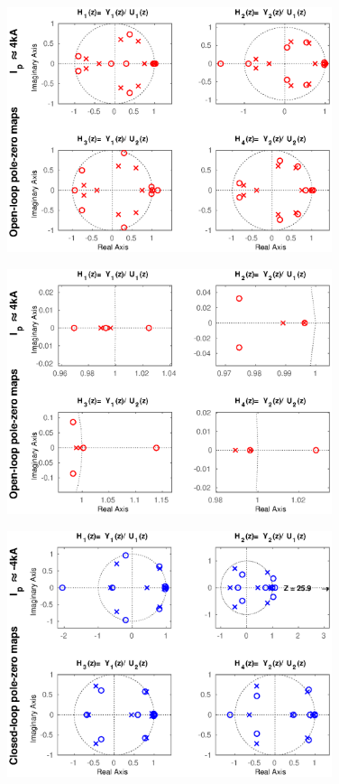 \begin{figure}
	\centering
	\includegraphics[width=0.85\textwidth]{Chp5/PoleZero/PoleZeroOpenPos.eps}
	\label{PoleZeroOpenPos}
\end{figure}	

\begin{figure}
	\centering
	\includegraphics[width=0.85\textwidth]{Chp5/PoleZero/PoleZeroOpenPosZoom.eps}
	\label{PoleZeroOpenPosZoom}
\end{figure}

\begin{figure}
	\centering
	\includegraphics[width=0.85\textwidth]{Chp5/PoleZero/PoleZeroCloseNeg.eps}
	\label{PoleZeroCloseNeg}
\end{figure}	

